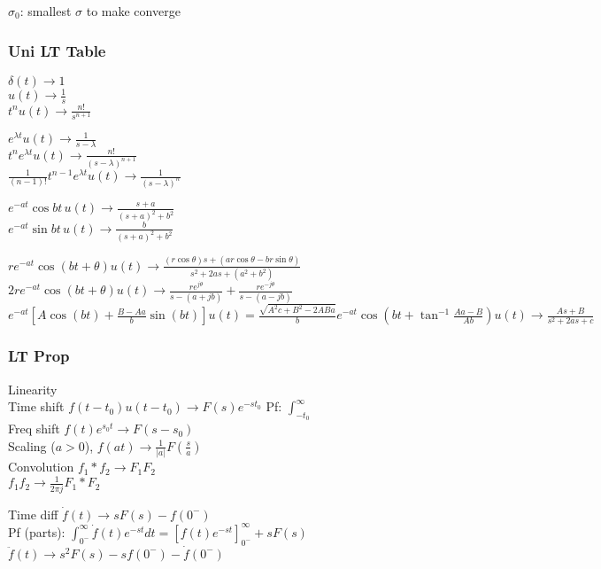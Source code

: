 \documentclass[4pt]{article}
\theoremstyle{definition}
\theoremstyle{definition}
\newcommand{\ra}{\rightarrow}
\newcommand{\ulint}{\int_{0^-}^{\infty}}    %
\begin{document}
$\sigma_0$: smallest $\sigma$ to make converge
\subsubsection{Uni LT Table}
    $\delta(t) \ra 1$\\
    $u(t) \ra \frac{1}{s}$\\
    $t^n u(t) \ra \frac{n!}{s^{n+1}}$               %

    \(e^{\lambda t} u(t) \ra \frac{1}{s-\lambda}\)\\        %
    \(t^n e^{\lambda t} u(t) \ra \frac{n!}{(s-\lambda)^{n+1}}\)\\     %
    \(\frac{1}{(n-1)!} t^{n-1} e^{\lambda t} u(t) \ra \frac{1}{(s-\lambda)^n} \)        %

    \(e^{-at} \cos bt\, u(t) \ra \frac{s+a}{(s+a)^2 + b^2}\)\\
    \(e^{-at} \sin bt\, u(t) \ra \frac{b}{(s+a)^2 + b^2}\)    

    \(re^{-at} \cos(bt + \theta) u(t) \ra \frac{(r\cos\theta)s + (ar \cos\theta - br\sin \theta)}{s^2 + 2as + (a^2 + b^2)}\)\\
    \(2re^{-at} \cos(bt + \theta) u(t) \ra \frac{re^{j\theta}}{s-(a+jb)}+\frac{re^{-j\theta}}{s-(a-jb)}\)\\
    \(e^{-at}\left[A\cos(b t) + \frac{B-Aa}{b}\sin(bt)\right] u(t) = \frac{\sqrt{A^2c + B^2 - 2ABa}}{b}e^{-at}\cos\left(bt + \tan^{-1}\frac{Aa-B}{Ab}\right) u(t) \ra \frac{As+B}{s^2+2as+c}\)
\subsubsection{LT Prop}
    Linearity\\
    Time shift \(f(t-t_0) u(t-t_0) \ra F(s) e^{-st_0}\) Pf: \(\int_{-t_0}^{\infty}\)\\ %
    Freq shift \(f(t) e^{s_0 t} \ra F(s-s_0)\)\\
    Scaling ($a > 0$), \(f(at) \ra \frac{1}{|a|} F(\frac{s}{a})\)\\   %
    Convolution \(f_1 * f_2 \ra F_1 F_2\)\\
    \(f_1 f_2 \ra \frac{1}{2\pi j} F_1 * F_2\)

    Time diff \(\dot{f}(t) \ra sF(s) - f(0^-)\)\\     %
        Pf (parts): \(\ulint \dot{f}(t) e^{-st} dt = \left[f(t) e^{-st} \right]^{\infty}_{0^-} + s F(s)\)\\    %
    \(\ddot{f}(t) \ra s^2 F(s) - sf(0^-) - \dot{f}(0^-)\)   %
\end{document}
